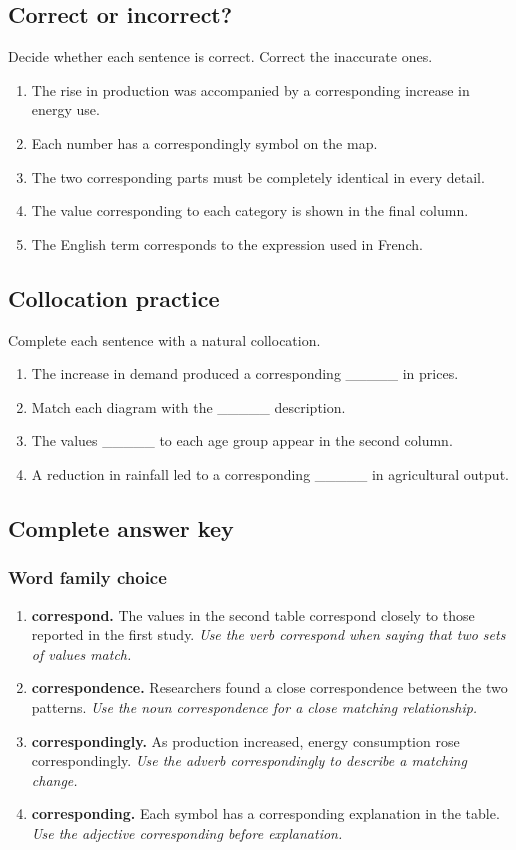 \documentclass[11pt]{article}
\begin{document}
\subsection{Correct or incorrect?}
Decide whether each sentence is correct. Correct the inaccurate ones.

\begin{enumerate}
  \item The rise in production was accompanied by a corresponding increase in energy use.
  \item Each number has a correspondingly symbol on the map.
  \item The two corresponding parts must be completely identical in every detail.
  \item The value corresponding to each category is shown in the final column.
  \item The English term corresponds to the expression used in French.
\end{enumerate}

\subsection{Collocation practice}
Complete each sentence with a natural collocation.

\begin{enumerate}
  \item The increase in demand produced a corresponding \_\_\_\_\_ in prices.
  \item Match each diagram with the \_\_\_\_\_ description.
  \item The values \_\_\_\_\_ to each age group appear in the second column.
  \item A reduction in rainfall led to a corresponding \_\_\_\_\_ in agricultural output.
\end{enumerate}

\subsection{Complete answer key}
\subsubsection{Word family choice}
\begin{enumerate}
  \item \textbf{correspond.} The values in the second table correspond closely to those reported in the first study. \emph{Use the verb correspond when saying that two sets of values match.}
  \item \textbf{correspondence.} Researchers found a close correspondence between the two patterns. \emph{Use the noun correspondence for a close matching relationship.}
  \item \textbf{correspondingly.} As production increased, energy consumption rose correspondingly. \emph{Use the adverb correspondingly to describe a matching change.}
  \item \textbf{corresponding.} Each symbol has a corresponding explanation in the table. \emph{Use the adjective corresponding before explanation.}
\end{enumerate}
\end{document}
